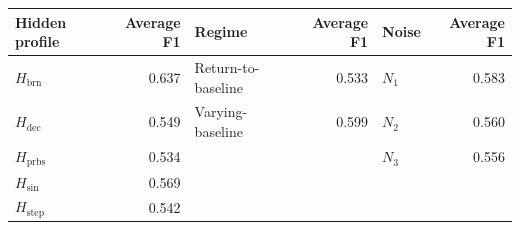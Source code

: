 \begin{tabular}{lrlrlr}
\toprule
Hidden profile & Average F1 & Regime & Average F1 & Noise & Average F1 \\
\midrule
$H_{\mathrm{brn}}$ & 0.637 & Return-to-baseline & 0.533 & $N_1$ & 0.583 \\
$H_{\mathrm{dec}}$ & 0.549 & Varying-baseline & 0.599 & $N_2$ & 0.560 \\
$H_{\mathrm{prbs}}$ & 0.534 &  &  & $N_3$ & 0.556 \\
$H_{\mathrm{sin}}$ & 0.569 &  &  &  &  \\
$H_{\mathrm{step}}$ & 0.542 &  &  &  &  \\
\bottomrule
\end{tabular}
